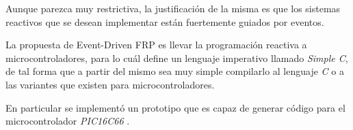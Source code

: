   Aunque parezca muy restrictiva, la justificación de la misma es que
los sistemas reactivos que se desean implementar están fuertemente
guiados por eventos.

  La propuesta de Event-Driven FRP es llevar la programación reactiva
a microcontroladores, para lo cuál define un lenguaje imperativo llamado
\textit{Simple C}, de tal forma que a partir del mismo sea muy simple
compilarlo al lenguaje \textit{C} o a las variantes que existen para 
microcontroladores.

  En particular se implementó un prototipo que es capaz de generar
código para el microcontrolador \textit{PIC16C66} \cite{microchip}.

